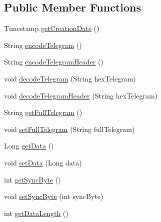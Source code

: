 \subsection*{Public Member Functions}
\begin{DoxyCompactItemize}
\item 
Timestamp \hyperlink{classch_1_1bfh_1_1gr33nopo55um_1_1enocean_1_1telegram_1_1_telegram_header_ad879ae7e3891f94c67aa08a8ddf9646c}{get\+Creation\+Date} ()
\item 
String \hyperlink{classch_1_1bfh_1_1gr33nopo55um_1_1enocean_1_1telegram_1_1_telegram_header_a73bdf8de10be28211d0166418cf4aa8b}{encode\+Telegram} ()
\item 
String \hyperlink{classch_1_1bfh_1_1gr33nopo55um_1_1enocean_1_1telegram_1_1_telegram_header_a799277c6c3e567bc1a17b3eff93244ab}{encode\+Telegram\+Header} ()
\item 
void \hyperlink{classch_1_1bfh_1_1gr33nopo55um_1_1enocean_1_1telegram_1_1_telegram_header_a9f1071f31c3eb9f555480aea587b4ccb}{decode\+Telegram} (String hex\+Telegram)
\item 
void \hyperlink{classch_1_1bfh_1_1gr33nopo55um_1_1enocean_1_1telegram_1_1_telegram_header_a436b8f22f13d0f91aa9c8e3f164d15d5}{decode\+Telegram\+Header} (String hex\+Telegram)
\item 
String \hyperlink{classch_1_1bfh_1_1gr33nopo55um_1_1enocean_1_1telegram_1_1_telegram_header_a018ed11b560f0ec305b1fc1c5c35de6f}{get\+Full\+Telegram} ()
\item 
void \hyperlink{classch_1_1bfh_1_1gr33nopo55um_1_1enocean_1_1telegram_1_1_telegram_header_a5ab36491d99972342b849721ff3ad43b}{set\+Full\+Telegram} (String full\+Telegram)
\item 
Long \hyperlink{classch_1_1bfh_1_1gr33nopo55um_1_1enocean_1_1telegram_1_1_telegram_header_a38111ea65ea31224785e26081e680519}{get\+Data} ()
\item 
void \hyperlink{classch_1_1bfh_1_1gr33nopo55um_1_1enocean_1_1telegram_1_1_telegram_header_afdafff6ff39ba1b252d0ef9634355d6c}{set\+Data} (Long data)
\item 
int \hyperlink{classch_1_1bfh_1_1gr33nopo55um_1_1enocean_1_1telegram_1_1_telegram_header_a5fa63d5b376c0dd3ca9163f3b659aef7}{get\+Sync\+Byte} ()
\item 
void \hyperlink{classch_1_1bfh_1_1gr33nopo55um_1_1enocean_1_1telegram_1_1_telegram_header_ae1abe768269fb7d40258861156eb8988}{set\+Sync\+Byte} (int sync\+Byte)
\item 
int \hyperlink{classch_1_1bfh_1_1gr33nopo55um_1_1enocean_1_1telegram_1_1_telegram_header_ab126d3782df92b82fbd671f84dc226fe}{get\+Data\+Length} ()

\end{DoxyCompactItemize}
